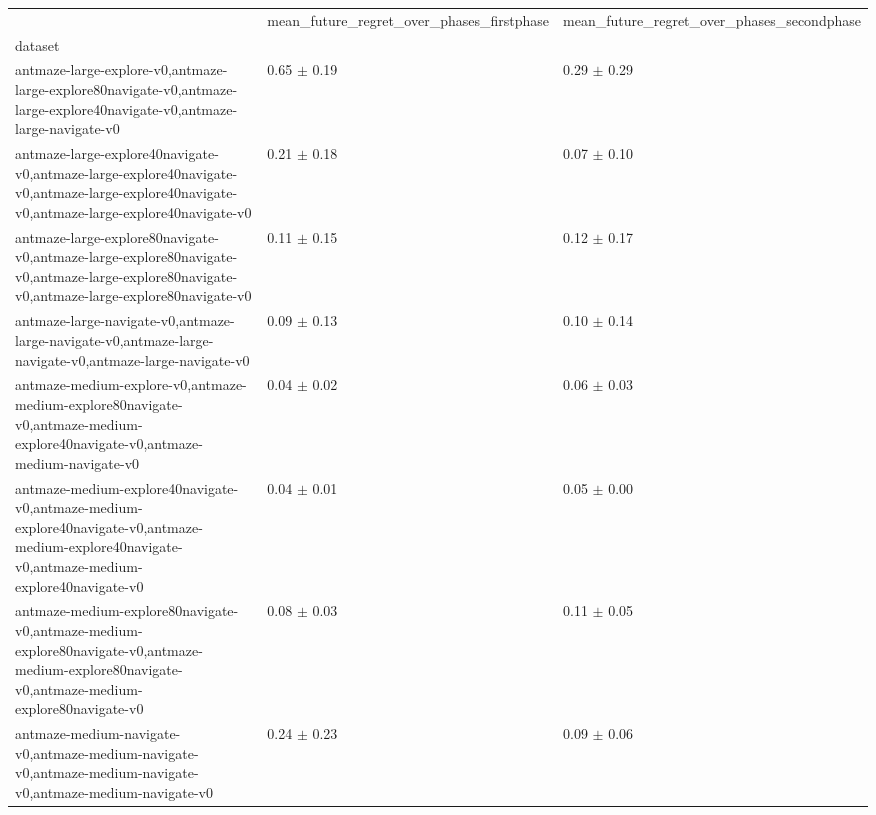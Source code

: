 \begin{tabular}{lll}
\toprule
 & mean_future_regret_over_phases_firstphase & mean_future_regret_over_phases_secondphase \\
dataset &  &  \\
\midrule
antmaze-large-explore-v0,antmaze-large-explore80navigate-v0,antmaze-large-explore40navigate-v0,antmaze-large-navigate-v0 & 0.65 $\pm$ 0.19 & 0.29 $\pm$ 0.29 \\
antmaze-large-explore40navigate-v0,antmaze-large-explore40navigate-v0,antmaze-large-explore40navigate-v0,antmaze-large-explore40navigate-v0 & 0.21 $\pm$ 0.18 & 0.07 $\pm$ 0.10 \\
antmaze-large-explore80navigate-v0,antmaze-large-explore80navigate-v0,antmaze-large-explore80navigate-v0,antmaze-large-explore80navigate-v0 & 0.11 $\pm$ 0.15 & 0.12 $\pm$ 0.17 \\
antmaze-large-navigate-v0,antmaze-large-navigate-v0,antmaze-large-navigate-v0,antmaze-large-navigate-v0 & 0.09 $\pm$ 0.13 & 0.10 $\pm$ 0.14 \\
antmaze-medium-explore-v0,antmaze-medium-explore80navigate-v0,antmaze-medium-explore40navigate-v0,antmaze-medium-navigate-v0 & 0.04 $\pm$ 0.02 & 0.06 $\pm$ 0.03 \\
antmaze-medium-explore40navigate-v0,antmaze-medium-explore40navigate-v0,antmaze-medium-explore40navigate-v0,antmaze-medium-explore40navigate-v0 & 0.04 $\pm$ 0.01 & 0.05 $\pm$ 0.00 \\
antmaze-medium-explore80navigate-v0,antmaze-medium-explore80navigate-v0,antmaze-medium-explore80navigate-v0,antmaze-medium-explore80navigate-v0 & 0.08 $\pm$ 0.03 & 0.11 $\pm$ 0.05 \\
antmaze-medium-navigate-v0,antmaze-medium-navigate-v0,antmaze-medium-navigate-v0,antmaze-medium-navigate-v0 & 0.24 $\pm$ 0.23 & 0.09 $\pm$ 0.06 \\
\bottomrule
\end{tabular}
